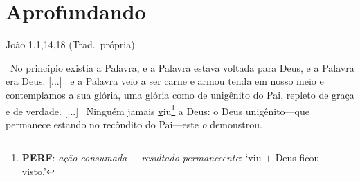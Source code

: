 \documentclass[12pt,aspectratio=169]{beamer}
\newcommand{\ver}[1]{%
    \raisebox{0.50ex}{%
        \scalebox{1.1}{%
            \pmb{\textbf{\textcolor{BSpbg}{#1}}}%
        }%
    }%
}
\newcommand{\QUOTE}[1]{%
    \par\noindent\hspace*{0.1\linewidth}%
    \begin{minipage}{0.8\linewidth}%
        \linespread{1.35}\large{#1}%
    \end{minipage}%
}
\newcommand{\YEL}[1]{{\textcolor{TXyel}{#1}}}
\newcommand{\MAG}[1]{{\textcolor{TXmag}{#1}}}
\newcommand{\BRI}[1]{{\textcolor{BSpbg}{#1}}}   %
\begin{document}
\section{Aprofundando}

    \begin{frame}{João 1.1,14,18 (Trad.~própria)}
        \QUOTE{%
            \normalsize
            \ver{1}~No princípio existia \MAG{a Palavra}, e \MAG{a Palavra}  estava  voltada
            para \BRI{Deus}, e \MAG{a Palavra era Deus}.  [...]  \ver{14}~e  \MAG{a  Palavra
            veio a ser carne} e armou tenda em nosso meio e contemplamos a sua \YEL{glória},
            uma \YEL{glória} como de unigênito do \BRI{Pai}, repleto  de  \YEL{graça}  e  de
            \YEL{verdade}.             [...]             \ver{18}~Ninguém             jamais
            \underline{v}iu\footnote{\textbf{\textsf{PERF}}:  \textit{ação  consumada  $+$  resultado
            permanecente\/}:  `viu  $+$  Deus  ficou  visto.'}  a  \BRI{Deus}:  o  \MAG{Deus
            unigênito}---que  permanece  estando  no  recôndito  do  \BRI{Pai}---este   {\it
            \BRI{o}} demonstrou.
        }
    \end{frame}

\end{document}
